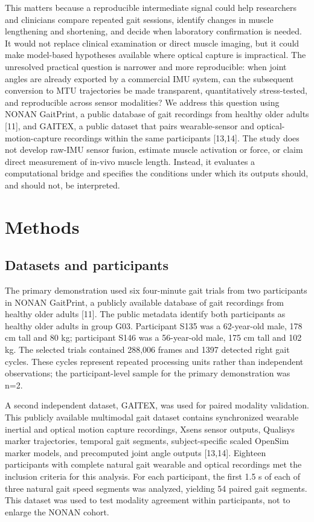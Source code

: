 \documentclass[11pt]{article}
\begin{document}
This matters because a reproducible intermediate signal could help researchers and clinicians compare repeated gait sessions, identify changes in muscle lengthening and shortening, and decide when laboratory confirmation is needed. It would not replace clinical examination or direct muscle imaging, but it could make model-based hypotheses available where optical capture is impractical. The unresolved practical question is narrower and more reproducible: when joint angles are already exported by a commercial IMU system, can the subsequent conversion to MTU trajectories be made transparent, quantitatively stress-tested, and reproducible across sensor modalities? We address this question using NONAN GaitPrint, a public database of gait recordings from healthy older adults [11], and GAITEX, a public dataset that pairs wearable-sensor and optical-motion-capture recordings within the same participants [13,14]. The study does not develop raw-IMU sensor fusion, estimate muscle activation or force, or claim direct measurement of in-vivo muscle length. Instead, it evaluates a computational bridge and specifies the conditions under which its outputs should, and should not, be interpreted.

\section{Methods}

\subsection{Datasets and participants}

The primary demonstration used six four-minute gait trials from two participants in NONAN GaitPrint, a publicly available database of gait recordings from healthy older adults [11]. The public metadata identify both participants as healthy older adults in group G03. Participant S135 was a 62-year-old male, 178 cm tall and 80 kg; participant S146 was a 56-year-old male, 175 cm tall and 102 kg. The selected trials contained 288,006 frames and 1397 detected right gait cycles. These cycles represent repeated processing units rather than independent observations; the participant-level sample for the primary demonstration was n=2.

A second independent dataset, GAITEX, was used for paired modality validation. This publicly available multimodal gait dataset contains synchronized wearable inertial and optical motion capture recordings, Xsens sensor outputs, Qualisys marker trajectories, temporal gait segments, subject-specific scaled OpenSim marker models, and precomputed joint angle outputs [13,14]. Eighteen participants with complete natural gait wearable and optical recordings met the inclusion criteria for this analysis. For each participant, the first 1.5 s of each of three natural gait speed segments was analyzed, yielding 54 paired gait segments. This dataset was used to test modality agreement within participants, not to enlarge the NONAN cohort.
\end{document}

